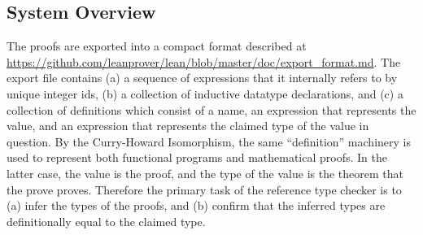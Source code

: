 \documentclass{article}
\begin{document}
\begin{spacing}{1.1}
\section{System Overview}

The proofs are exported into a compact format described at \url{https://github.com/leanprover/lean/blob/master/doc/export_format.md}. The export file contains (a) a sequence of expressions that it internally refers to by unique integer ids, (b) a collection of inductive datatype declarations, and (c) a collection of definitions which consist of a name, an expression that represents the value, and an expression that represents the claimed type of the value in question. By the Curry-Howard Isomorphism, the same ``definition'' machinery is used to represent both functional programs and mathematical proofs. In the latter case, the value is the proof, and the type of the value is the theorem that the prove proves. Therefore the primary task of the reference type checker is to (a) infer the types of the proofs, and (b) confirm that the inferred types are definitionally equal to the claimed type.


\end{spacing}
\end{document}
